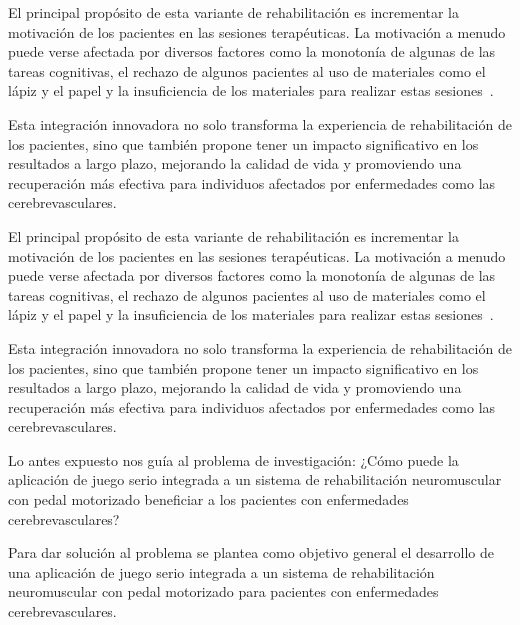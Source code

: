 \begin{introduction}
    \vspace{5pt} El principal propósito de esta variante de rehabilitación es incrementar la motivación de los pacientes en las sesiones terapéuticas. La motivación a menudo puede verse afectada por diversos factores como la monotonía de algunas de las tareas cognitivas, el rechazo de algunos pacientes al uso de materiales como el lápiz y el papel y la insuficiencia de los materiales para realizar estas sesiones~\cite{regalon12019juegos}. 
    
    \vspace{5pt} Esta integración innovadora no solo transforma la experiencia de rehabilitación de los pacientes, sino que también propone tener un impacto significativo en los resultados a largo plazo, mejorando la calidad de vida y promoviendo una recuperación más efectiva para individuos afectados por enfermedades como las cerebrevasculares.

    \vspace{5pt}
    El principal propósito de esta variante de rehabilitación es incrementar la motivación de los pacientes en las sesiones terapéuticas. La motivación a menudo puede verse afectada por diversos factores como la monotonía de algunas de las tareas cognitivas, el rechazo de algunos pacientes al uso de materiales como el lápiz y el papel y la insuficiencia de los materiales para realizar estas sesiones~\cite{regalon12019juegos}. 

    \vspace{5pt}
    Esta integración innovadora no solo transforma la experiencia de rehabilitación de los pacientes, sino que también propone tener un impacto significativo en los resultados a largo plazo, mejorando la calidad de vida y promoviendo una recuperación más efectiva para individuos afectados por enfermedades como las cerebrevasculares.

    \vspace{5pt}
    Lo antes expuesto nos guía al problema de investigación: ¿Cómo puede la aplicación de juego serio integrada a un sistema de rehabilitación neuromuscular con pedal motorizado beneficiar a los pacientes con enfermedades cerebrevasculares?

    \vspace{5pt}
    Para dar solución al problema se plantea como objetivo general el desarrollo de una aplicación de juego serio integrada a un sistema de rehabilitación neuromuscular con pedal motorizado para pacientes con enfermedades cerebrevasculares.
    

\end{introduction}
